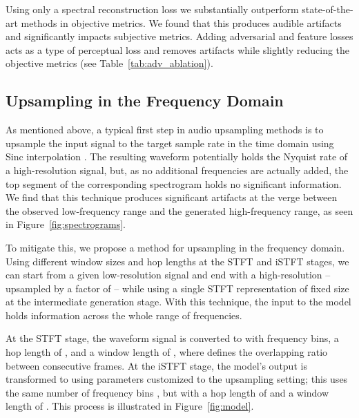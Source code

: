 Using only a spectral reconstruction loss we substantially outperform state-of-the-art methods in objective metrics. We found that this produces audible artifacts and significantly impacts subjective metrics. Adding adversarial and feature losses acts as a type of perceptual loss and removes artifacts while slightly reducing the objective metrics (see Table~\ref{tab:adv_ablation}).

\vspace{-0.2cm}
\subsection{Upsampling in the Frequency Domain}
\label{subsec:spec_upsampling}

As mentioned above, a typical first step in audio upsampling methods is to upsample the input signal to the target sample rate in the time domain using Sinc interpolation \cite{tfilm, nugan, nuwave2, seanet, bwe-all-you-need, mugan}. The resulting waveform potentially holds the Nyquist rate of a high-resolution signal, but, as no additional frequencies are actually added, the top segment of the corresponding spectrogram holds no significant information. We find that this technique produces significant artifacts at the verge between the observed low-frequency range and the generated high-frequency range, as seen in Figure~\ref{fig:spectrograms}.



To mitigate this, we propose a method for upsampling in the frequency domain. Using different window sizes and hop lengths at the \ac{STFT} and \ac{iSTFT} stages, we can start from a given low-resolution signal  and end with a high-resolution  -- upsampled by a factor of  -- while using a single \ac{STFT} representation of fixed size at the intermediate generation stage. With this technique, the input to the model holds information across the whole range of frequencies.

At the \ac{STFT} stage, the waveform signal  is converted to  with  frequency bins, a hop length of , and a window length of , where  defines the overlapping ratio between consecutive frames.
At the \ac{iSTFT} stage, the model's output  is transformed to  using parameters customized to the upsampling setting; this uses the same number of frequency bins , but with a hop length of  and a window length of . This process is illustrated in Figure~\ref{fig:model}.